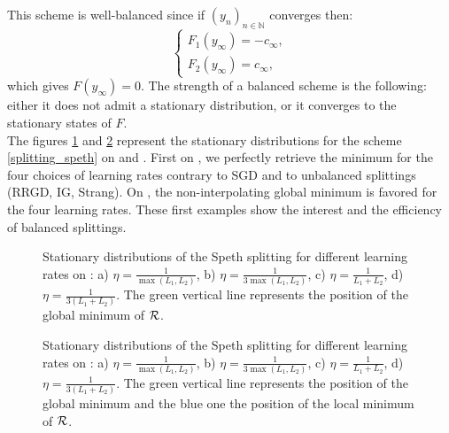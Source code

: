 This scheme is well-balanced since if $(y_n)_{n\in \mathbb{N}}$ converges then:
\begin{equation*}
	\left\{
	\begin{array}{ll}
		F_1(y_{\infty})=-c_{\infty}, \\
		F_2(y_{\infty})=c_{\infty},
	\end{array}
	\right.
\end{equation*}
which gives $F(y_{\infty})=0$. The strength of a balanced scheme is the following: either it does not admit a stationary distribution, or it converges to the stationary states of $F$.\\
The figures \ref{speth_ex1} and \ref{speth_ex2} represent the stationary distributions for the scheme \eqref{splitting_speth} on \exOne and \exTwo. First on \exOne, we perfectly retrieve the minimum for the four choices of learning rates contrary to SGD and to unbalanced splittings (RRGD, IG, Strang). On \exTwo, the non-interpolating global minimum is favored for the four learning rates. These first examples show the interest and the efficiency of balanced splittings. 

\begin{figure}[h!]
	\centering
	\scalebox{0.45}{}
	\caption{Stationary distributions of the Speth splitting for different learning rates on \exOne: a) $\eta=\frac{1}{\max(L_1,L_2)}$, b) $\eta=\frac{1}{3\max(L_1,L_2)}$, c) $\eta=\frac{1}{L_1+L_2}$, d) $\eta=\frac{1}{3(L_1+L_2)}$. The green vertical line represents the position of the global minimum of $\mathcal{R}$.}
	\label{speth_ex1}
\end{figure}

\begin{figure}[h!]
	\centering
	\scalebox{0.45}{}
	\caption{Stationary distributions of the Speth splitting for different learning rates on \exTwo: a) $\eta=\frac{1}{\max(L_1,L_2)}$, b) $\eta=\frac{1}{3\max(L_1,L_2)}$, c) $\eta=\frac{1}{L_1+L_2}$, d) $\eta=\frac{1}{3(L_1+L_2)}$. The green vertical line represents the position of the global minimum and the blue one the position of the local minimum of $\mathcal{R}$.}
	\label{speth_ex2}
\end{figure}

